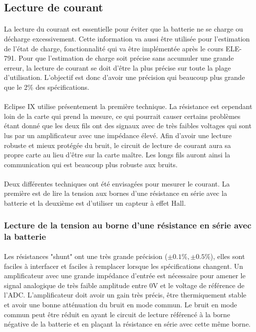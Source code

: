 
\subsection{Lecture de courant}
	\paragraph*{}
	La lecture du courant est essentielle pour éviter que la batterie ne se charge ou décharge excessivement. Cette information va aussi être utilisée pour l'estimation de l'état de charge, fonctionnalité qui va être implémentée après le cours ELE-791. Pour que l'estimation de charge soit précise sans accumuler une grande erreur, la lecture de courant se doit d'être la plus précise sur toute la plage d'utilisation. L'objectif est donc d'avoir une précision qui beaucoup plus grande que le 2\% des spécifications. 
	
	\paragraph*{}
	Eclipse IX utilise présentement la première technique. La résistance est cependant loin de la carte qui prend la mesure, ce qui pourrait causer certains problèmes étant donné que les deux fils ont des signaux avec de très faibles voltages qui sont lus par un amplificateur avec une impédance élevé. Afin d'avoir une lecture robuste et mieux protégée du bruit, le circuit de lecture de courant aura sa propre carte au lieu d'être sur la carte maître. Les longs fils auront ainsi la communication qui est beaucoup plus robuste aux bruits. 
	
	\paragraph*{}
	Deux différentes techniques ont été envisagées pour mesurer le courant. La première est de lire la tension aux bornes d'une résistance en série avec la batterie et la deuxième est d'utiliser un capteur à effet Hall. 
	
	
	\subsubsection*{Lecture de la tension au borne d'une résistance en série avec la batterie}
	\paragraph*{}
	Les résistances "shunt" ont une très grande précision ($\pm 0.1 \% , \pm 0.5 \%$), elles sont faciles à interfacer et faciles à remplacer lorsque les spécifications changent. Un amplificateur avec une grande impédance d'entrée est nécessaire pour amener le signal analogique de très faible amplitude entre 0V et le voltage de référence de l'ADC. L'amplificateur doit avoir un gain très précis, être thermiquement stable et avoir une bonne atténuation du bruit en mode commun. Le bruit en mode commun peut être réduit en ayant le circuit de lecture référencé à la borne négative de la batterie et en plaçant la résistance en série avec cette même borne.
		
